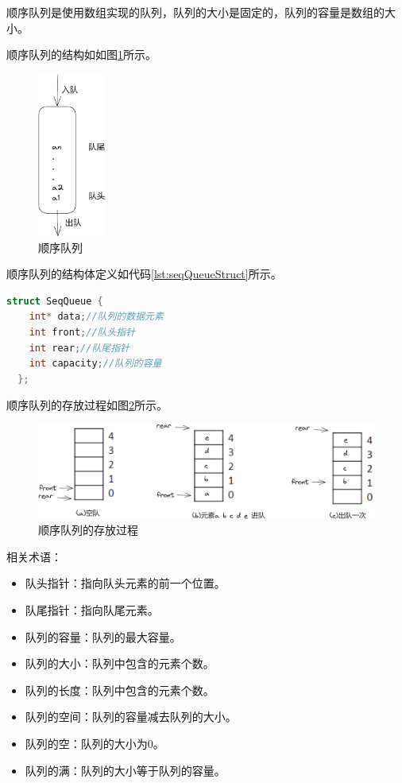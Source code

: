 \documentclass[lang=cn,newtx,10pt,scheme=chinese]{elegantbook}
\begin{document}
顺序队列是使用数组实现的队列，队列的大小是固定的，队列的容量是数组的大小。

顺序队列的结构如如图\ref{fig:seqQueue}所示。

\begin{figure}[h]
  \centering
  \includegraphics[width=0.2\textwidth]{./figure/pdf/cropped/seqQueue.pdf}
  \caption{顺序队列}
  \label{fig:seqQueue}
\end{figure}

顺序队列的结构体定义如代码\ref{lst:seqQueueStruct}所示。

\begin{lstlisting}[language=C++, caption={顺序队列结构体定义}, label={lst:seqQueueStruct}]
  struct SeqQueue {
    int* data;//队列的数据元素
    int front;//队头指针
    int rear;//队尾指针
    int capacity;//队列的容量
  };
\end{lstlisting}


顺序队列的存放过程如图\ref{fig:seqQueuePut}所示。

\begin{figure}[h]
  \centering
  \includegraphics[width=1\textwidth]{./figure/pdf/cropped/seqQueuePut.pdf}
  \caption{顺序队列的存放过程}
  \label{fig:seqQueuePut}
\end{figure}

相关术语：

\begin{itemize}
  \item 队头指针：指向队头元素的前一个位置。
  \item 队尾指针：指向队尾元素。
  \item 队列的容量：队列的最大容量。
  \item 队列的大小：队列中包含的元素个数。
  \item 队列的长度：队列中包含的元素个数。
  \item 队列的空间：队列的容量减去队列的大小。
  \item 队列的空：队列的大小为0。
  \item 队列的满：队列的大小等于队列的容量。
\end{itemize}
\end{document}
